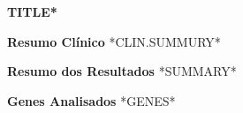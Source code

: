\documentclass[12pt]{article}
\begin{document}
\begin{center}
{\selectfont{}\color{coolblack}\LARGE\bfseries *TITLE*}
\end{center}

{\selectfont{}\color{coolblack}\normalsize\bfseries Resumo Clínico}\hfill\break
*CLIN.SUMMURY*
\bigskip

\begin{tcolorbox}
\textbf{Resumo dos Resultados}\hfill\break
*SUMMARY*
\end{tcolorbox}
\bigskip


{\selectfont{}\color{coolblack}\normalsize\bfseries Genes Analisados}\hfill\break
*GENES*
\bigskip



\end{document}
